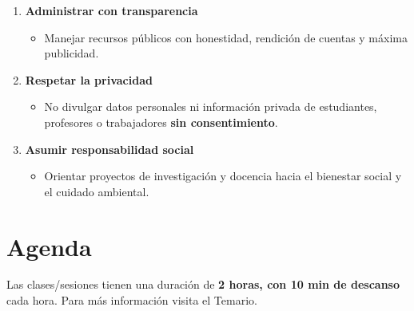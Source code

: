 \documentclass[
  spanish,
  12pt,
  letterpaper,
  DIV=11,
  numbers=noendperiod]{scrreprt}
\providecommand{\tightlist}{%
  \setlength{\itemsep}{0pt}\setlength{\parskip}{0pt}}
\begin{document}
\begin{enumerate}
  \begin{itemize}
  \tightlist
  \item
    Los docentes deben aplicar criterios claros y justos en exámenes y
    calificaciones, evitando favoritismos o conflictos de interés.
  \end{itemize}
\item
  \textbf{Administrar con transparencia}

  \begin{itemize}
  \tightlist
  \item
    Manejar recursos públicos con honestidad, rendición de cuentas y
    máxima publicidad.
  \end{itemize}
\item
  \textbf{Respetar la privacidad}

  \begin{itemize}
  \tightlist
  \item
    No divulgar datos personales ni información privada de estudiantes,
    profesores o trabajadores \textbf{sin consentimiento}.
  \end{itemize}
\item
  \textbf{Asumir responsabilidad social}

  \begin{itemize}
  \tightlist
  \item
    Orientar proyectos de investigación y docencia hacia el bienestar
    social y el cuidado ambiental.
  \end{itemize}
\end{enumerate}

\section{Agenda 📆}

Las clases/sesiones tienen una duración de \textbf{2 horas, con 10 min
de descanso} cada hora. Para más información visita el Temario.
\end{document}
